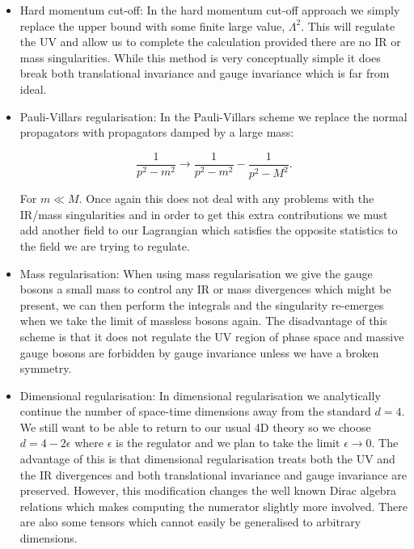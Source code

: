 	\begin{itemize}
		\item Hard momentum cut-off: In the hard momentum cut-off approach we simply replace the upper bound
		with some finite large value, $\Lambda^2$.  This will regulate the UV and allow us to complete the
		calculation provided there are no IR or mass singularities.  While this method is very conceptually
		simple it does break both translational invariance and gauge invariance which is far from ideal.

		\item Pauli-Villars regularisation: In the Pauli-Villars scheme we replace the normal propagators with propagators damped by a large mass:

		      \begin{equation}
			      \frac{1}{p^2-m^2}\rightarrow\frac{1}{p^2-m^2} - \frac{1}{p^2-M^2}.
		      \end{equation}

		      For $m\ll M$.  Once again this does not deal with any problems with the IR/mass singularities and in order to get this
		      extra contributions we must add another field to our Lagrangian which satisfies the opposite statistics to the field we are trying to regulate.

		\item Mass regularisation: When using mass regularisation we give the gauge bosons a small mass to control any
		IR or mass divergences which might be present, we can then perform the integrals and the singularity re-emerges
		when we take the limit of massless bosons again.  The disadvantage of this scheme is that it does not regulate
		the UV region of phase space and massive gauge bosons are forbidden by gauge invariance unless we have a broken symmetry.

		\item Dimensional regularisation:  In dimensional regularisation we analytically continue the number of space-time
		dimensions away from the standard $d=4$.  We still want to be able to return to our usual 4D theory so we choose
		$d=4-2\epsilon$ where $\epsilon$ is the regulator and we plan to take the limit $\epsilon\rightarrow 0$.  The
		advantage of this is that dimensional regularisation treats both the UV and the IR divergences and both translational
		invariance and gauge invariance are preserved.  However, this modification changes the well known Dirac algebra
		relations which makes computing the numerator slightly more involved.  There are also some tensors which cannot
		easily be generalised to arbitrary dimensions.
	\end{itemize}

